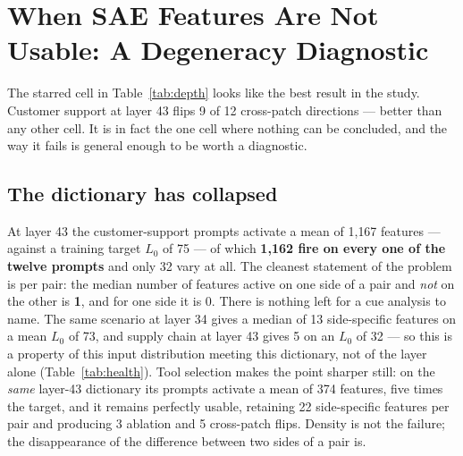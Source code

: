 \documentclass{article}
\begin{document}
\section{When SAE Features Are Not Usable: A Degeneracy Diagnostic}
\label{sec:degeneracy}

The starred cell in Table~\ref{tab:depth} looks like the best result in the study. Customer support at layer 43 flips 9 of 12 cross-patch directions --- better than any other cell. It is in fact the one cell where nothing can be concluded, and the way it fails is general enough to be worth a diagnostic.

\subsection{The dictionary has collapsed}

At layer 43 the customer-support prompts activate a mean of 1{,}167 features --- against a training target $L_0$ of 75 --- of which \textbf{1{,}162 fire on every one of the twelve prompts} and only 32 vary at all. The cleanest statement of the problem is per pair: the median number of features active on one side of a pair and \emph{not} on the other is \textbf{1}, and for one side it is 0. There is nothing left for a cue analysis to name. The same scenario at layer 34 gives a median of 13 side-specific features on a mean $L_0$ of 73, and supply chain at layer 43 gives 5 on an $L_0$ of 32 --- so this is a property of this input distribution meeting this dictionary, not of the layer alone (Table~\ref{tab:health}). Tool selection makes the point sharper still: on the \emph{same} layer-43 dictionary its prompts activate a mean of 374 features, five times the target, and it remains perfectly usable, retaining 22 side-specific features per pair and producing 3 ablation and 5 cross-patch flips. Density is not the failure; the disappearance of the difference between two sides of a pair is.
\end{document}
